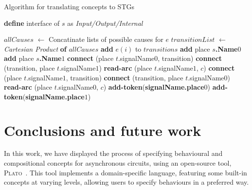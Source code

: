 \documentclass[british,conference,compsoc]{IEEEtran}
\newcommand{\noun}[1]{\textsc{#1}}
\begin{document}
\begin{algorithm}[t]
\begin{algorithmic}
\caption{Algorithm for translating concepts to STGs\label{alg:translation}}
  \State \textbf{define} interface of $s$ as \emph{Input/Output/Internal}
\EndFor

  \State $allCauses$ $\leftarrow$ Concatinate lists of possible causes for $e$
  \State $transitionList$ $\leftarrow$ \emph{Cartesian Product} \textbf{of} 
	$allCauses$
    \State \textbf{add} $e(i)$ to $transitions$
  \EndFor 
\EndFor
{}
  \State \textbf{add} place \textbf{$s$.Name}$0$
  \State \textbf{add} place \textbf{$s$.Name}$1$
\EndFor
{}
    \State \textbf{connect} (place $t$.signalName$0$, transition)
    \State \textbf{connect} (transition, place $t$.signalName$1$)
      \State \textbf{read-arc} (place $t$.signalName$1$, $c$)
    \EndFor
  \EndIf
    \State \textbf{connect} (place $t$.signalName$1$, transition)
    \State \textbf{connect} (transition, place $t$.signalName$0$)
      \State \textbf{read-arc} (place $t$.signalName$0$, $c$)
    \EndFor
  \EndIf
\EndFor
{}
    \State \textbf{add-token}(\textbf{signalName.place}$0$)
  \EndIf 
    \State \textbf{add-token}(\textbf{signalName.place}$1$)
  \EndIf
\EndFor
\end{algorithmic}
\end{algorithm}

\vspace{-2mm}

\section{Conclusions and future work\label{sec:conclusions}}

\vspace{-3mm}

In this work, we have displayed the process of specifying behavioural and 
compositional concepts for asynchronous circuits, using an open-source
tool, \noun{Plato}~\cite{2016_concepts_github}. This tool implements a domain-specific 
language, featuring some built-in concepts at varying levels, allowing users to
specify behaviours in a preferred way. 
\end{document}
